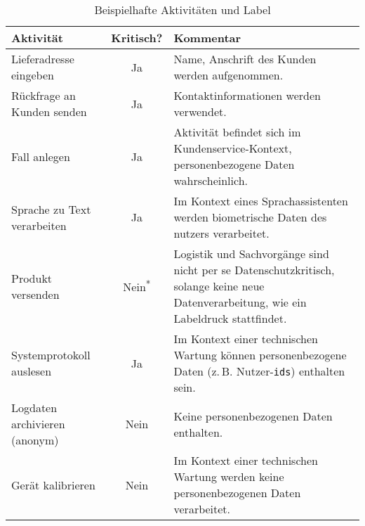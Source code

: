 \begin{table}[htbp]
    \centering
    \caption{Beispielhafte Aktivitäten und Label}
    \begin{tabularx}{\textwidth}{p{} c p{}}
        \toprule
        Aktivität & Kritisch? & Kommentar \\
        \midrule
        Lieferadresse eingeben & Ja & Name, Anschrift des Kunden werden aufgenommen. \\
        Rückfrage an Kunden senden & Ja & Kontaktinformationen werden verwendet. \\
        Fall anlegen & Ja & Aktivität befindet sich im Kundenservice-Kontext, personenbezogene Daten wahrscheinlich. \\
        Sprache zu Text verarbeiten & Ja & Im Kontext eines Sprachassistenten werden biometrische Daten des nutzers verarbeitet. \\
        Produkt versenden & Nein\textsuperscript{*} & Logistik und Sachvorgänge sind nicht per se Datenschutzkritisch, solange keine neue Datenverarbeitung, wie ein Labeldruck stattfindet. \\
        Systemprotokoll auslesen & Ja & Im Kontext einer technischen Wartung können personenbezogene Daten (z.\,B. Nutzer-\texttt{ids}) enthalten sein. \\
        Logdaten archivieren (anonym) & Nein & Keine personenbezogenen Daten enthalten. \\
        Gerät kalibrieren & Nein & Im Kontext einer technischen Wartung werden keine personenbezogenen Daten verarbeitet. \\
        \bottomrule
    \end{tabularx}
    \label{tab:labeling-examples}
\end{table}